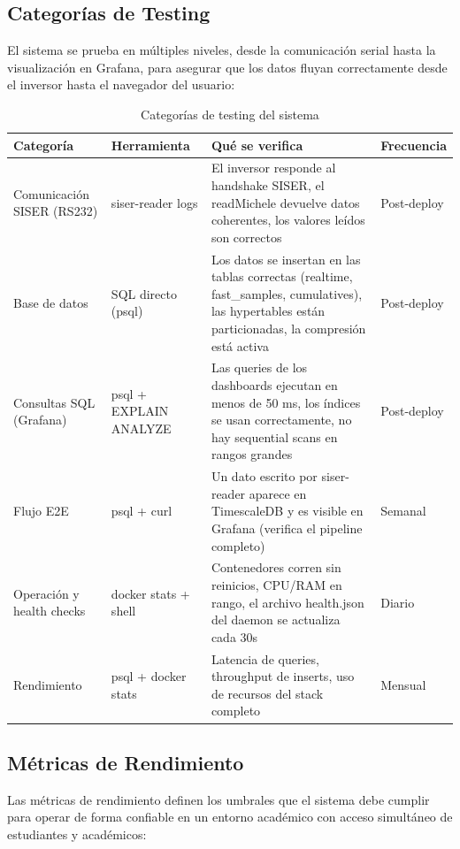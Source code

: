 \documentclass[12pt,a4paper]{article}
\begin{document}
\subsection{Categor\'ias de Testing}

El sistema se prueba en m\'ultiples niveles, desde la comunicaci\'on serial hasta la visualizaci\'on en Grafana, para asegurar que los datos fluyan correctamente desde el inversor hasta el navegador del usuario:

\begin{table}[H]
\centering
\begin{tabular}{llp{5.5cm}l}
\toprule
\textbf{Categor\'ia} & \textbf{Herramienta} & \textbf{Qu\'e se verifica} & \textbf{Frecuencia} \\
\midrule
Comunicaci\'on SISER (RS232) & siser-reader logs & El inversor responde al handshake SISER, el readMichele devuelve datos coherentes, los valores le\'idos son correctos & Post-deploy \\
Base de datos & SQL directo (psql) & Los datos se insertan en las tablas correctas (realtime, fast\_samples, cumulatives), las hypertables est\'an particionadas, la compresi\'on est\'a activa & Post-deploy \\
Consultas SQL (Grafana) & psql + EXPLAIN ANALYZE & Las queries de los dashboards ejecutan en menos de 50 ms, los \'indices se usan correctamente, no hay sequential scans en rangos grandes & Post-deploy \\
Flujo E2E & psql + curl & Un dato escrito por siser-reader aparece en TimescaleDB y es visible en Grafana (verifica el pipeline completo) & Semanal \\
Operaci\'on y health checks & docker stats + shell & Contenedores corren sin reinicios, CPU/RAM en rango, el archivo health.json del daemon se actualiza cada 30s & Diario \\
Rendimiento & psql + docker stats & Latencia de queries, throughput de inserts, uso de recursos del stack completo & Mensual \\
\bottomrule
\end{tabular}
\caption{Categor\'ias de testing del sistema}
\end{table}

\subsection{M\'etricas de Rendimiento}

Las m\'etricas de rendimiento definen los umbrales que el sistema debe cumplir para operar de forma confiable en un entorno acad\'emico con acceso simult\'aneo de estudiantes y acad\'emicos:
\end{document}
